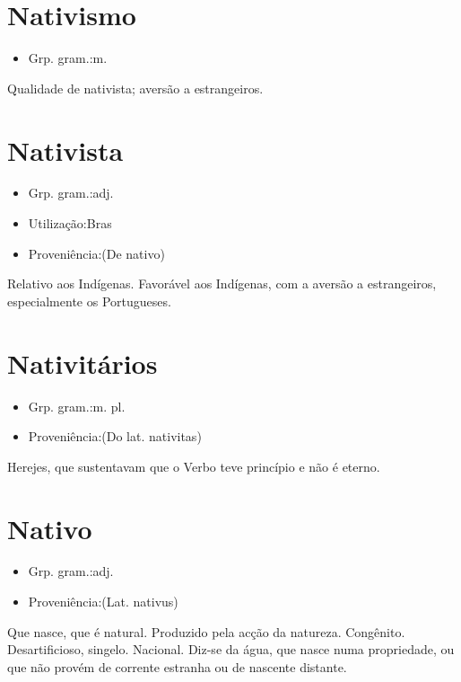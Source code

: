 \section{Nativismo}
\begin{itemize}
\item {Grp. gram.:m.}
\end{itemize}
Qualidade de nativista; aversão a estrangeiros.
\section{Nativista}
\begin{itemize}
\item {Grp. gram.:adj.}
\end{itemize}
\begin{itemize}
\item {Utilização:Bras}
\end{itemize}
\begin{itemize}
\item {Proveniência:(De \textunderscore nativo\textunderscore )}
\end{itemize}
Relativo aos Indígenas.
Favorável aos Indígenas, com a aversão a estrangeiros, especialmente os Portugueses.
\section{Nativitários}
\begin{itemize}
\item {Grp. gram.:m. pl.}
\end{itemize}
\begin{itemize}
\item {Proveniência:(Do lat. \textunderscore nativitas\textunderscore )}
\end{itemize}
Herejes, que sustentavam que o Verbo teve princípio e não é eterno.
\section{Nativo}
\begin{itemize}
\item {Grp. gram.:adj.}
\end{itemize}
\begin{itemize}
\item {Proveniência:(Lat. \textunderscore nativus\textunderscore )}
\end{itemize}
Que nasce, que é natural.
Produzido pela acção da natureza.
Congênito.
Desartificioso, singelo.
Nacional.
Diz-se da água, que nasce numa propriedade, ou que não provém de corrente estranha ou de nascente distante.
